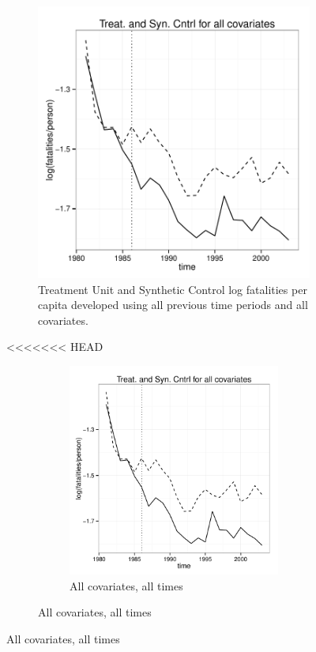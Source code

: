 \documentclass[letterpaper, 12pt]{article}
\begin{document}
\begin{figure}
\begin{centering}
\begin{figure}[htbp]
\begin{center}
\includegraphics{img-split-full.pdf}
\caption{Treatment Unit and Synthetic Control log fatalities per capita developed using all previous time periods and all covariates.}
\label{fig:c14}
\end{center}
\end{figure}

<<<<<<< HEAD
\begin{figure}
  \begin{centering}
    \begin{subfigure}[b]{\textwidth}
      \includegraphics{img-split-full.pdf}
      \caption{All covariates, all times}
      \label{fig:c12a}
    \end{subfigure}


\end{centering}
\end{figure}
\end{centering}
\end{figure}
\end{document}
